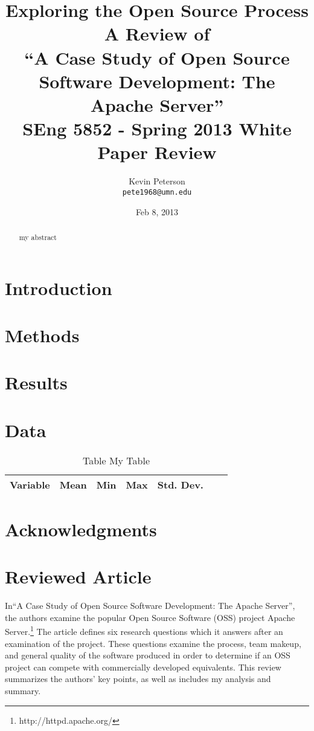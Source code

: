 \documentclass{article}
\title{
Exploring the Open Source Process
\\[2\baselineskip]
A Review of \\``A Case Study of Open Source Software Development: The Apache Server''
\\[2\baselineskip]
SEng 5852 - Spring 2013 White Paper Review
\\[2\baselineskip]
}
\author{Kevin Peterson\\
\small \texttt{pete1968@umn.edu}
}
\date{Feb 8, 2013}
\begin{document}
\maketitle


\begin{abstract}
my abstract
\end{abstract}

\section{Introduction}

\section{Methods}

\section{Results}

\section{Data}
\begin{table}
\caption{Table My Table}
\begin{center}
\begin{tabular}{rrrrrrr}
\hline
\hline
Variable & Mean & Min & Max & Std. Dev. \\ 
\hline

\hline
\end{tabular}
\end{center}
\end{table}

\section{Acknowledgments}


\section{Reviewed Article}
In``A Case Study of Open Source Software Development: The Apache Server''\cite{mockus2000case}, the authors examine the popular Open Source Software (OSS) project Apache Server.\footnote{http://httpd.apache.org/} The article defines six research questions which it answers after an examination of the project. These questions examine the process, team makeup, and general quality of the software produced in order to determine if an OSS project can compete with commercially developed equivalents. This review summarizes the authors' key points, as well as includes my analysis and summary.
\end{document}
